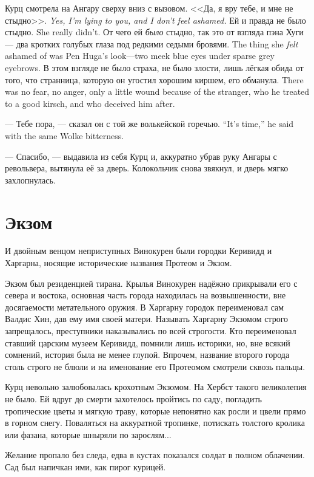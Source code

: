 Курц смотрела на Ангару сверху вниз с вызовом.
{<<Да, я вру тебе, и мне не стыдно>>.}
{\textit{Yes, I'm lying to you, and I don't feel ashamed.}}
{Ей и правда не было стыдно.}
{She really didn't.}
{От чего ей \emph{было} стыдно, так это от взгляда пэна Хуги --- два кротких голубых глаза под редкими седыми бровями.}
{The thing she \emph{felt} ashamed of was Pen Huga's look---two meek blue eyes under sparse grey eyebrows.}
{В этом взгляде не было страха, не было злости, лишь лёгкая обида от того, что странница, которую он угостил хорошим киршем, его обманула.}
{There was no fear, no anger, only a little wound because of the stranger, who he treated to a good kirsch, and who deceived him after.}

{--- Тебе пора, --- сказал он с той же волькейской горечью.}
{``It's time,'' he said with the same Wolke bitterness.}

--- Спасибо, --- выдавила из себя Курц и, аккуратно убрав руку Ангары с револьвера, вытянула её за дверь.
Колокольчик снова звякнул, и дверь мягко захлопнулась.

\section{Экзом}

И двойным венцом неприступных Винокурен были городки Керивидд и Харгарна, носящие исторические названия Протеом и Экзом.

Экзом был резиденцией тирана.
Крылья Винокурен надёжно прикрывали его с севера и востока, основная часть города находилась на возвышенности, вне досягаемости метательного оружия.
В Харгарну городок переименовал сам Валдис Хин, дав ему имя своей матери.
Называть Харгарну Экзомом строго запрещалось, преступники наказывались по всей строгости.
Кто переименовал ставший царским музеем Керивидд, помнили лишь историки, но, вне всякий сомнений, история была не менее глупой.
Впрочем, название второго города столь строго не блюли и на именование его Протеомом смотрели сквозь пальцы.

Курц невольно залюбовалась крохотным Экзомом.
На Хербст такого великолепия не было.
Ей вдруг до смерти захотелось пройтись по саду, погладить тропические цветы и мягкую траву, которые непонятно как росли и цвели прямо в горном снегу.
Поваляться на аккуратной тропинке, потискать толстого кролика или фазана, которые шныряли по зарослям...

Желание пропало без следа, едва в кустах показался солдат в полном облачении.
Сад был напичкан ими, как пирог курицей.

